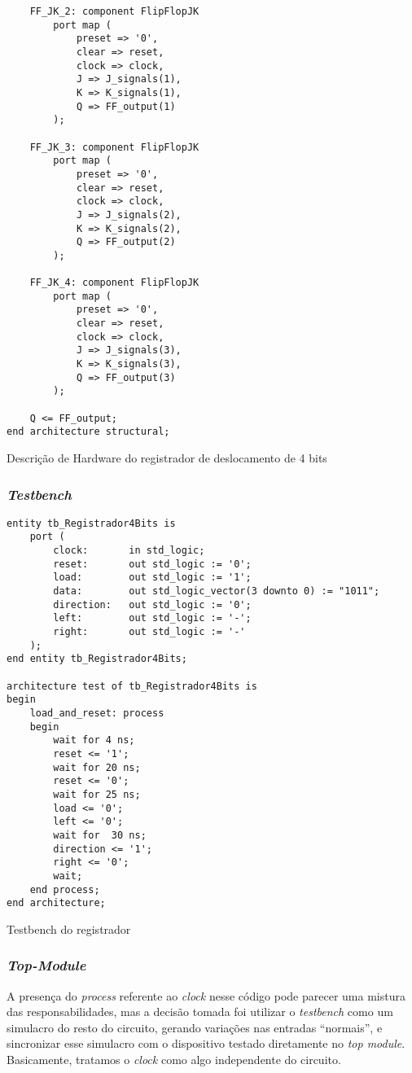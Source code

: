 \documentclass[a4paper,12pt]{article}
\newenvironment{code}{\captionsetup{type=listing}}{}
\begin{document}
\begin{code}
\begin{verbatim}
    FF_JK_2: component FlipFlopJK
        port map (
            preset => '0',
            clear => reset,
            clock => clock,
            J => J_signals(1),
            K => K_signals(1),
            Q => FF_output(1)
        );

    FF_JK_3: component FlipFlopJK
        port map (
            preset => '0',
            clear => reset,
            clock => clock,
            J => J_signals(2),
            K => K_signals(2),
            Q => FF_output(2)
        );

    FF_JK_4: component FlipFlopJK
        port map (
            preset => '0',
            clear => reset,
            clock => clock,
            J => J_signals(3),
            K => K_signals(3),
            Q => FF_output(3)
        );

    Q <= FF_output;
end architecture structural;
    \end{verbatim}
    \caption{Descrição de Hardware do registrador de deslocamento de 4 bits}
\end{code}

\subsubsection{\textit{Testbench}}
\begin{code}
    \begin{verbatim}
entity tb_Registrador4Bits is
    port (
        clock:       in std_logic;
        reset:       out std_logic := '0';
        load:        out std_logic := '1';
        data:        out std_logic_vector(3 downto 0) := "1011";
        direction:   out std_logic := '0';
        left:        out std_logic := '-';
        right:       out std_logic := '-'
    );
end entity tb_Registrador4Bits;

architecture test of tb_Registrador4Bits is
begin
    load_and_reset: process
    begin
        wait for 4 ns;
        reset <= '1';
        wait for 20 ns;
        reset <= '0';
        wait for 25 ns;
        load <= '0';
        left <= '0';
        wait for  30 ns;
        direction <= '1';
        right <= '0';
        wait;
    end process;
end architecture;

    \end{verbatim}
    \caption{Testbench do registrador}
\end{code}

\subsubsection{\textit{Top-Module}}
A presença do \textit{process} referente ao \textit{clock} nesse código pode parecer uma mistura das responsabilidades, mas a decisão tomada foi utilizar o \textit{testbench} como um simulacro do resto do circuito, gerando variações nas entradas ``normais'', e sincronizar esse simulacro com o dispositivo testado diretamente no \textit{top module}. Basicamente, tratamos o \textit{clock} como algo independente do circuito.
\end{document}

